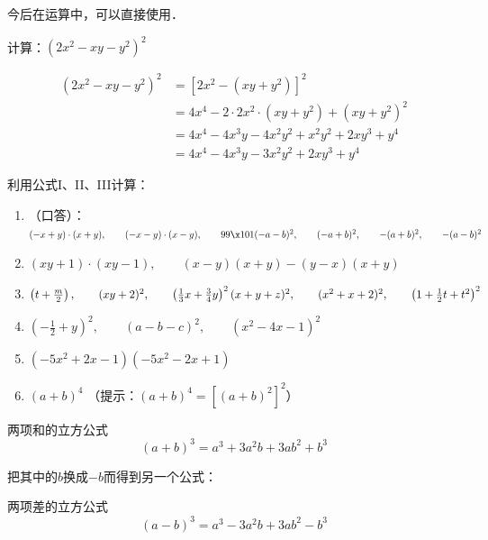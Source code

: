 今后在运算中，可以直接使用．

\begin{example}
    计算：$(2x^2-xy-y^2)^2$
\end{example}

\begin{solution}
    \[\begin{split}
(2x^2-xy-y^2)^2 &= [2x^2-(xy+y^2)]^2\\
&=4x^4-2\cdot 2x^2\cdot (xy+y^2)+  (xy+y^2)^2\\
&=     4x^4-4x^3y-4x^2y^2+x^2y^2+2xy^3+y^4\\ 
&=       4x^4-4x^3y-3x^2y^2+2xy^3+y^4
    \end{split}\]
\end{solution}

\begin{ex}
    利用公式I、II、III计算：
\begin{enumerate}
    \item （口答）：$(-x+y)\cdot (x+y), \qquad (-x-y)\cdot (x-y),\qquad 99\x 101\\
    (-a-b)^2,\qquad (-a+b)^2,\qquad -(a+b)^2,\qquad -(a-b)^2 $

    \item $(xy+1)\cdot (xy-1),\qquad (x-y)(x+y)-(y-x)(x+y)$
    \item $\left(t+\frac{m}{2}\right),\qquad (xy+2)^2,\qquad \left(\frac{1}{3}x+\frac{3}{4}y\right)^2\\
     (x+y+z)^2,\qquad (x^2+x+2)^2,\qquad \left(1+\frac{1}{2}t+t^2\right)^2$
\item $\left(-\frac{1}{2}+y\right)^2,\qquad (a-b-c)^2,\qquad (x^2-4x-1)^2$
\item $(-5x^2+2x-1)(-5x^2-2x+1)$
\item $(a+b)^4$  （提示：$(a+b)^4=[(a+b)^2]^2$）
    \end{enumerate}
\end{ex}

\begin{blk}{两项和的立方公式}
    \begin{equation*}
        (a+b)^3=a^3+3a^2b+3ab^2+b^3 \tag{IV}
    \end{equation*}
\end{blk}

把其中的$b$换成$-b$而得到另一个公式：

\begin{blk}{两项差的立方公式}
    \begin{equation*}
        (a-b)^3=a^3-3a^2b+3ab^2-b^3 \tag{V}  
    \end{equation*}
\end{blk}

